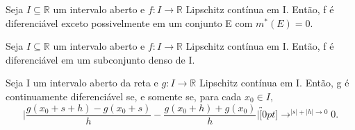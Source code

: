 \documentclass[Analysis/analysis_notes.tex]{subfiles}
\begin{document}
\begin{crl*}
	Seja \(I\subseteq{\mathbb{R}}\) um intervalo aberto e \(f:I\rightarrow \mathbb{R}\) Lipschitz contínua em I.
	Então, f é diferenciável exceto possivelmente em um conjunto E com \(m^{*}(E) = 0.\)
\end{crl*}
\begin{crl*}
	Seja \(I\subseteq{\mathbb{R}}\) um intervalo aberto e \(f:I\rightarrow \mathbb{R}\) Lipschitz contínua em I. Então, f é diferenciável em um
	subconjunto denso de I.
\end{crl*}
\begin{theorem*}
	Seja I um intervalo aberto da reta e \(g:I\rightarrow \mathbb{R}\) Lipschitz contínua
	em I. Então, g é continuamente diferenciável se, e somente se, para cada \(x_{0}\in I,\)
	\[
		\biggl|\frac{g(x_{0}+s+h)-g(x_{0}+s)}{h}-\frac{g(x_{0}+h)+g(x_{0})}{h}\biggr|\overbracket[0pt]{\longrightarrow}^{|s|+|h|\to 0}0.
	\]
\end{theorem*}
\end{document}
